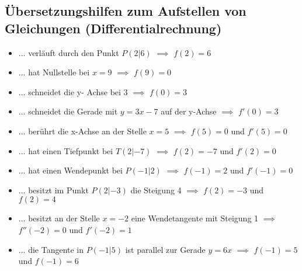 \newpage
\subsection{Übersetzungshilfen zum Aufstellen von Gleichungen (Differentialrechnung)}

\begin{itemize}
    \item ... verläuft durch den Punkt $P(2|6)$ $\implies$ $f(2)=6$
    \item ... hat Nullstelle bei $x=9$ $\implies$ $f(9)=0$
    \item ... schneidet die y- Achse bei $3$ $\implies$ $f(0)=3$
    \item ... schneidet die Gerade mit $y=3x-7$ auf der y-Achse $\implies$ $f'(0)=3$
    \item ... berührt die x-Achse an der Stelle $x=5$ $\implies$ $f(5)=0$ und $f'(5)=0$ 
    \item ... hat einen Tiefpunkt bei $T(2|-7)$ $\implies$ $f(2)=-7$ und $f'(2)=0$
    \item ... hat einen Wendepunkt bei $P(-1|2)$ $\implies$ $f(-1)=2$ und $f'(-1)=0$
    \item ... besitzt im Punkt $P(2|-3)$ die Steigung 4 $\implies$ $f(2)=-3$ und $f(2)=4$
    \item ... besitzt an der Stelle $x=-2$ eine Wendetangente mit Steigung 1 $\implies$ $f''(-2)=0$ und $f'(-2)=1$
    \item ... die Tangente in $P(-1|5)$ ist parallel zur Gerade $y=6x$ $\implies$ $f(-1)=5$ und $f(-1)=6$
\end{itemize}